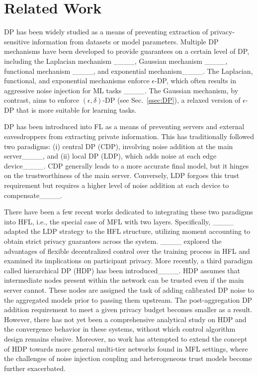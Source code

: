 \section{Related Work}
DP has been widely studied as a means of preventing extraction of privacy-sensitive information from datasets or model parameters. Multiple DP mechanisms have been developed to provide guarantees on a certain level of DP, including the Laplacian mechanism ____, Gaussian mechanism ____, functional mechanism ____, and exponential mechanism____. 
The Laplacian, functional, and exponential mechanisms enforce $\epsilon$-DP, which often results in aggressive noise injection for ML tasks ____. The Gaussian mechanism, by contrast, aims to enforce $(\epsilon,\delta)$-DP (see Sec.~\ref{ssec:DP}), a relaxed version of $\epsilon$-DP that is more suitable for learning tasks.


DP has been introduced into FL as a means of preventing servers and external eavesdroppers from extracting private information.
This has traditionally followed two paradigms: (i) central DP (CDP), involving noise addition at the main server____, and (ii) local DP (LDP), which adds noise at each edge device____. 
CDP generally leads to a more accurate final model, but it hinges on the trustworthiness of the main server. Conversely, LDP forgoes this trust requirement but requires a higher level of noise addition at each device to compensate____.

There have been a few recent works dedicated to integrating these two paradigms into HFL, i.e., the special case of MFL with two layers. Specifically, ____ adapted the LDP strategy to the HFL structure, utilizing moment accounting to obtain strict privacy guarantees across the system. ____ explored the advantages of flexible decentralized control over the training process in HFL and examined its implications on participant privacy. 
More recently, a third paradigm called hierarchical DP (HDP) has been introduced____. 
HDP assumes that intermediate nodes present within the network can be trusted even if the main server cannot. These nodes are assigned the task of adding calibrated DP noise to the aggregated models prior to passing them upstream. The post-aggregation DP addition requirement to meet a given privacy budget becomes smaller as a result. However, there has not yet been a comprehensive analytical study on HDP and the convergence behavior in these systems, without which control algorithm design remains elusive. Moreover, no work has attempted to extend the concept of HDP towards more general multi-tier networks found in MFL settings, where the challenges of noise injection coupling and heterogeneous trust models become further exacerbated.